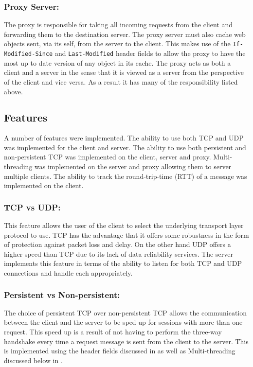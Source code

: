 \documentclass[10pt,twocolumn]{witseiepaper}
\begin{document}
	\subsubsection{Proxy Server:}

	The proxy is responsible for taking all incoming requests from the client and forwarding them to the destination server. The proxy server must also cache web objects sent, via its self, from the server to the client. This makes use of the \verb|If-Modified-Since| and \verb|Last-Modified| header fields to allow the proxy to have the most up to date version of any object in its cache. The proxy acts as both a client and a server in the sense that it is viewed as a server from the perspective of the client and vice versa. As a result it has many of the responsibility listed above.

\subsection{Features}

A number of features were implemented. The ability to use both TCP and UDP was implemented for the client and server. The ability to use both persistent and non-persistent TCP was implemented on the client, server and proxy. Multi-threading was implemented on the server and proxy allowing them to server multiple clients. The ability to track the round-trip-time (RTT) of a message was implemented on the client.

	\subsubsection{TCP vs UDP:}

	This feature allows the user of the client to select the underlying transport layer protocol to use. TCP has the advantage that it offers some robustness in the form of protection against packet loss and delay. On the other hand UDP offers a higher speed than TCP due to its lack of data reliability services. The server implements this feature in terms of the ability to listen for both TCP and UDP connections and handle each appropriately. 

	\subsubsection{Persistent vs Non-persistent:}

	The choice of persistent TCP over non-persistent TCP allows the communication between the client and the server to be sped up for sessions with more than one request. This speed up is a result of not having to perform the three-way handshake every time a request message is sent from the client to the server. This is implemented using the header fields discussed in  as well as Multi-threading discussed below in .
\end{document}
